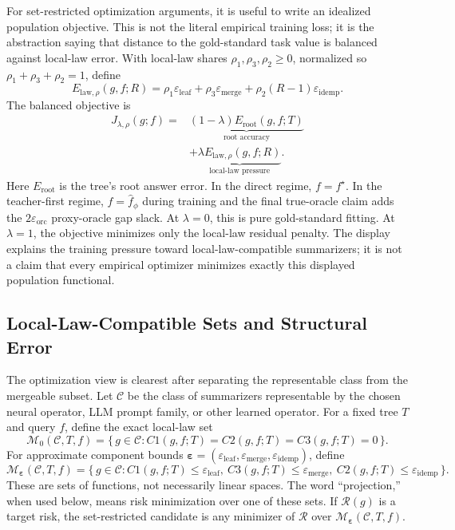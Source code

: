 For set-restricted optimization arguments, it is useful to write an
idealized population objective. This is not the literal empirical
training loss; it is the abstraction saying that distance to the
gold-standard task value is balanced against local-law error. With
local-law shares
\(\rho_1,\rho_3,\rho_2\ge 0\), normalized so
\(\rho_1+\rho_3+\rho_2=1\), define
\[
  E_{\mathrm{law},\rho}(g,f;R)
  =
  \rho_1\varepsilon_{\mathrm{leaf}}
  +\rho_3\varepsilon_{\mathrm{merge}}
  +\rho_2(R-1)\varepsilon_{\mathrm{idemp}}.
\]
The balanced objective is
\begin{equation}
\label{eq:v7-oracle-projection-objective}
  \begin{aligned}
  J_{\lambda,\rho}(g;f)
  =
  &\underbrace{(1-\lambda)E_{\mathrm{root}}(g,f;T)}
    _{\text{root accuracy}} \\
  &+\underbrace{\lambda E_{\mathrm{law},\rho}(g,f;R)}
    _{\text{local-law pressure}} .
  \end{aligned}
\end{equation}
Here \(E_{\mathrm{root}}\) is the tree's root answer error. In the
direct regime, \(f=f^\star\). In the teacher-first regime,
\(f=\widehat f_\phi\) during training and the final true-oracle claim
adds the \(2\varepsilon_{\mathrm{orc}}\) proxy-oracle gap slack.
At \(\lambda=0\), this is pure gold-standard fitting. At
\(\lambda=1\), the objective minimizes only the local-law residual
penalty. The display explains the training pressure toward
local-law-compatible summarizers; it is not a claim that every
empirical optimizer minimizes exactly this displayed population
functional.

\subsection{Local-Law-Compatible Sets and Structural Error}
\label{app:v7-projection-sets}

The optimization view is clearest after separating the representable
class from the mergeable subset. Let \(\mathcal C\) be the class of
summarizers representable by the chosen neural operator, LLM prompt
family, or other learned operator. For a fixed tree \(T\) and query
\(f\), define the exact local-law set
\[
  \mathcal M_0(\mathcal C,T,f)
  =
  \{\,g\in\mathcal C:
      C1(g,f;T)=C2(g,f;T)=C3(g,f;T)=0\,\}.
\]
For approximate component bounds
\(\boldsymbol\varepsilon=(\varepsilon_{\mathrm{leaf}},
\varepsilon_{\mathrm{merge}},\varepsilon_{\mathrm{idemp}})\), define
\[
  \mathcal M_{\boldsymbol\varepsilon}(\mathcal C,T,f)
  =
  \{\,g\in\mathcal C:
      C1(g,f;T)\le\varepsilon_{\mathrm{leaf}},\
      C3(g,f;T)\le\varepsilon_{\mathrm{merge}},\
      C2(g,f;T)\le\varepsilon_{\mathrm{idemp}}\,\}.
\]
These are sets of functions, not necessarily linear spaces. The
word ``projection,'' when used below, means risk minimization over one
of these sets. If \(\mathcal R(g)\) is a target risk, the
set-restricted candidate is any minimizer of \(\mathcal R\) over
\(\mathcal M_{\boldsymbol\varepsilon}(\mathcal C,T,f)\).

